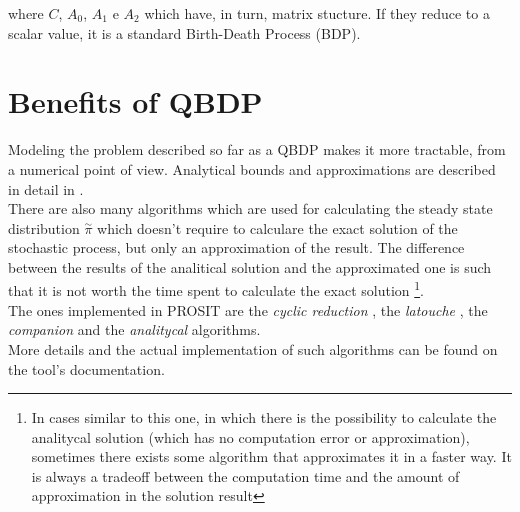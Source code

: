 where \( C \), \( A_{0} \), \( A_{1} \) e \( A_{2} \) which have, in turn, matrix stucture. If they reduce to a scalar value, it is a standard Birth-Death Process (BDP).

\section{Benefits of QBDP}
Modeling the problem described so far as a QBDP makes it more tractable, from a numerical point of view. Analytical bounds and approximations are described in detail in \cite{probGuarantees}.\\
There are also many algorithms which are used for calculating the steady state distribution \( \overset{\sim}{\pi} \) which doesn't require to calculare the exact solution of the stochastic process, but only an approximation of the result. The difference between the results of the analitical solution and the approximated one is such that it is not worth the time spent to calculate the exact solution \footnote{In cases similar to this one, in which there is the possibility to calculate the analitycal solution (which has no computation error or approximation), sometimes there exists some algorithm that approximates it in a faster way. It is always a tradeoff between the computation time and the amount of approximation in the solution result}.\\
The ones implemented in PROSIT are the \emph{cyclic reduction} \cite{cyclic}, the \emph{latouche} \cite{latouche}, the \emph{companion} \cite{probGuarantees} and the \emph{analitycal} \cite{probGuarantees} algorithms.\\
More details and the actual implementation of such algorithms can be found on the tool's documentation.